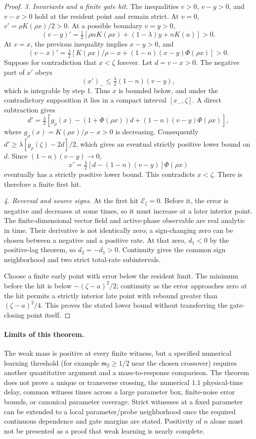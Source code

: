 \documentclass[11pt]{article}
\numberwithin{equation}{section}
\theoremstyle{definition}
\theoremstyle{remark}
\newcommand{\1}{\mathbf 1}
\begin{document}
\begin{proof}
\emph{3. Invariants and a finite gate hit.}
The inequalities $v>0$, $v-y>0$, and $v-x>0$ hold at the resident point
and remain strict. At $v=0$, $v'=\rho K(\rho x)/2>0$.
At a possible boundary $v=y>0$,
\[
 (v-y)'=\tfrac12[\rho nK(\rho x)+(1-\lambda)y+nK(u)]>0.
\]
At $v=x$, the previous inequality implies $x-y>0$, and
\[
 (v-x)'=\tfrac\lambda2
 [K(\rho x)/\rho-x+(1-n)(x-y)\Phi(\rho x)]>0.
\]
Suppose for contradiction that $x<\zeta$ forever. Let $d=v-x>0$.
The negative part of $x'$ obeys
\[
 (x')_-\le\tfrac\lambda2(1-n)(v-y),
\]
which is integrable by step 1. Thus $x$ is bounded below, and under the
contradictory supposition it lies in a compact interval $[x_-,\zeta]$.
A direct subtraction gives
\[
 d'=\tfrac\lambda2\left[
 g_\rho(x)-(1+\Phi(\rho x))d
 +(1-n)(v-y)\Phi(\rho x)\right],
\]
where $g_\rho(x)=K(\rho x)/\rho-x>0$ is decreasing.
Consequently $d'\ge\lambda[g_\rho(\zeta)-2d]/2$, which gives an
eventual strictly positive lower bound on $d$. Since
$(1-n)(v-y)\to0$,
\[
 x'=\tfrac\lambda2[d-(1-n)(v-y)]\Phi(\rho x)
\]
eventually has a strictly positive lower bound. This contradicts $x<\zeta$.
There is therefore a finite first hit.

\emph{4. Reversal and source signs.}
At the first hit $\mathcal E_\zeta=0$. Before it, the error is negative
and decreases at some times, so it must increase at a later interior
point. The finite-dimensional vector field and active-phase observable
are real analytic in time. Their derivative is not identically zero;
a sign-changing zero can be chosen between a negative and a positive
rate. At that zero, $d_1<0$ by the positive-lag theorem, so
$d_2=-d_1>0$. Continuity gives the common sign neighborhood and two
strict total-rate subintervals.

Choose a finite early point with error below the resident limit. The
minimum before the hit is below $-(\zeta-a)^2/2$; continuity as the error
approaches zero at the hit permits a strictly interior late point with
rebound greater than $(\zeta-a)^2/4$. This proves the stated lower bound
without transferring the gate-closing point itself.
\end{proof}

\paragraph{Limits of this theorem.}
The weak mass is positive at every finite witness, but a specified numerical
learning threshold (for example $\mathsf m_2\ge1/2$ near the chosen crossover)
requires another quantitative argument and a mass-to-response comparison.
The theorem does not prove a unique or transverse crossing, the numerical
$1.1$ physical-time delay, common witness times across a large parameter
box, finite-noise error bounds, or canonical parameter coverage. Strict
witnesses at a fixed parameter can be extended to a local parameter/probe
neighborhood once the required continuous dependence and gate margins
are stated. Positivity of $n$ alone must not be presented as a proof that
weak learning is nearly complete.
\end{document}

